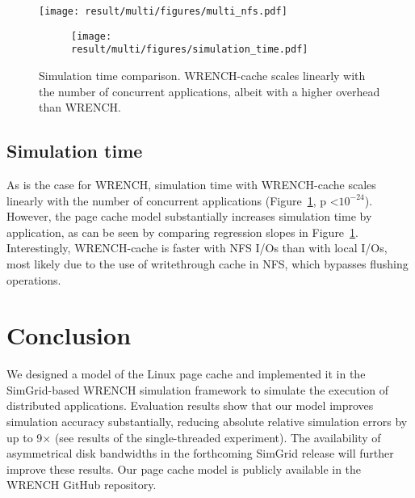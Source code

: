 \documentclass[conference]{IEEEtran}
\newcommand{\simgrid}{SimGrid\xspace}
\newcommand{\wrench}{WRENCH\xspace}
\begin{document}
            \begin{figure*}
                \begin{subfigure}{\linewidth}
                    \centering
                    \texttt{[image: result/multi/figures/multi\_nfs.pdf]}
                \end{subfigure}
                \caption{NFS results with 3~GB files (\textit{Exp 3}). Averages on 5 repetitions.}
                \label{fig:multi_nfs}
                \end{figure*}
    
            \begin{figure}
                \begin{subfigure}{\columnwidth}
                    \centering
                    \texttt{[image: result/multi/figures/simulation\_time.pdf]}
                \end{subfigure}
                \caption{Simulation time comparison. \wrench-cache scales
                linearly with the number of concurrent applications, albeit
                with a higher overhead than \wrench.}
                \label{fig:multi_time}
                \end{figure}
    
        \subsection{Simulation time}
        As is the case for \wrench, simulation time with \wrench-cache scales
        linearly with the number of concurrent applications
        (Figure~\ref{fig:multi_time}, p \textless $10^{-24}$). However, the page
        cache model substantially increases simulation time by
        application, as can be seen by comparing regression slopes in
        Figure~\ref{fig:multi_time}. Interestingly, \wrench-cache is faster with 
        NFS I/Os than with local I/Os, most likely due to the use of writethrough
        cache in NFS, which bypasses flushing operations.

    \section{Conclusion}
    \label{discussion}
    We designed a model of the Linux page cache and implemented it in the
    \simgrid-based \wrench simulation framework to simulate the execution
    of distributed applications.
    Evaluation results show that our model improves simulation accuracy
    substantially, reducing absolute relative simulation errors by up to
    9$\times$ (see results of the single-threaded experiment). The
    availability of asymmetrical disk bandwidths in the forthcoming
    \simgrid release will further improve these results.
    Our page cache model is publicly available in the \wrench GitHub
    repository.
\end{document}
